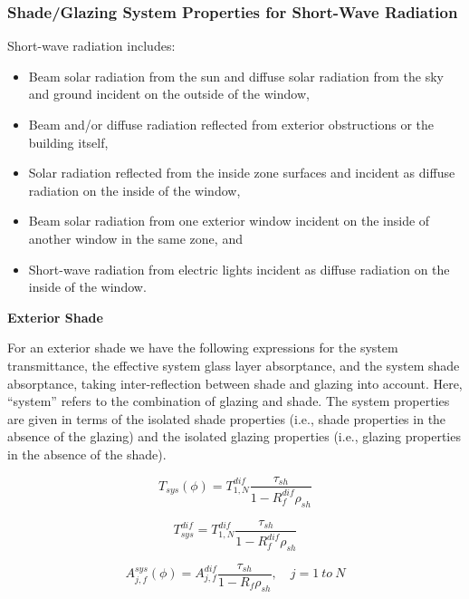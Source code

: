 \subsubsection{Shade/Glazing System Properties for Short-Wave Radiation}\label{shadeglazing-system-properties-for-short-wave-radiation}

Short-wave radiation includes:

\begin{itemize}
\item Beam solar radiation from the sun and diffuse solar radiation from the sky and ground incident on the outside of the window,
\item Beam and/or diffuse radiation reflected from exterior obstructions or the building itself,
\item Solar radiation reflected from the inside zone surfaces and incident as diffuse radiation on the inside of the window,
\item Beam solar radiation from one exterior window incident on the inside of another window in the same zone, and
\item Short-wave radiation from electric lights incident as diffuse radiation on the inside of the window.
\end{itemize}

\textbf{Exterior Shade}

For an exterior shade we have the following expressions for the system transmittance, the effective system glass layer absorptance, and the system shade absorptance, taking inter-reflection between shade and glazing into account. Here, ``system'' refers to the combination of glazing and shade. The system properties are given in terms of the isolated shade properties (i.e., shade properties in the absence of the glazing) and the isolated glazing properties (i.e., glazing properties in the absence of the shade).

\begin{equation}
{T_{sys}}(\phi ) = T_{1,N}^{dif}\frac{{{\tau_{sh}}}}{{1 - R_f^{dif}{\rho_{sh}}}}
\end{equation}

\begin{equation}
T_{sys}^{dif} = T_{1,N}^{dif}\frac{{{\tau_{sh}}}}{{1 - R_f^{dif}{\rho_{sh}}}}
\end{equation}

\begin{equation}
A_{j,f}^{sys}(\phi ) = A_{j,f}^{dif}\frac{{{\tau_{sh}}}}{{1 - {R_f}{\rho_{sh}}}},\quad j = 1~to~N
\end{equation}

